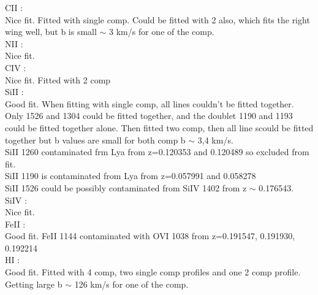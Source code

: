 \documentclass[12pt,draft]{report}
\begin{document}
CII :  \\  \hspace*{1.5cm}
        Nice fit. Fitted with single comp. Could be fitted with 2 also, which fits the right wing well, but b is small  $\sim$ 3 km/s for one of the  comp.  \\

NII :  \\  \hspace*{1.5cm}
        Nice fit.  \\

CIV :  \\  \hspace*{1.5cm}
        Nice fit. Fitted with 2 comp  \\

SiII :  \\  \hspace*{1.5cm}
        Good fit. When fitting with single comp, all lines couldn't be fitted together. Only 1526 and 1304 could be fitted together, and the doublet 1190 and 1193 could be fitted together alone. Then fitted two comp, then all line scould be fitted together but b values are small for both comp b $\sim$  3,4 km/s. \\ 
        SiII 1260 contaminated frm Lya from z=0.120353 and 0.120489 so excluded from fit.  \\
        SiII 1190 is contaminated from Lya from z=0.057991 and 0.058278 \\
        SiII 1526 could be possibly contaminated from SiIV 1402 from z $\sim$ 0.176543. \\

SiIV :  \\  \hspace*{1.5cm}
        Nice fit.  \\

FeII :  \\  \hspace*{1.5cm}
        Good fit. FeII 1144 contaminated with OVI 1038 from z=0.191547, 0.191930, 0.192214  \\

HI :  \\  \hspace*{1.5cm}
        Good fit. Fitted with 4 comp, two single comp profiles and one 2 comp profile. Getting large b  $\sim$  126 km/s for one of the comp.  \\



\newpage
\end{document}
